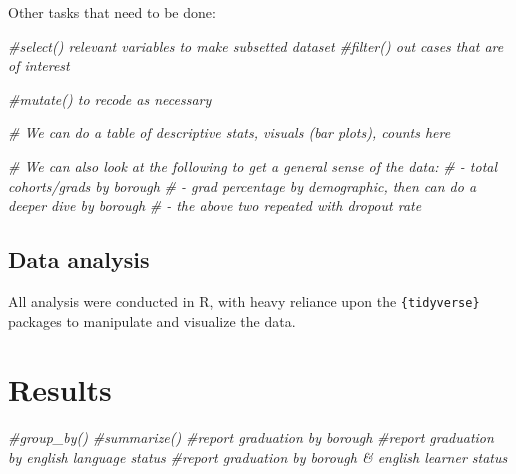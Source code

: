 \documentclass[
  english,
  man, fleqn, noextraspace]{apa6}
\newenvironment{Shaded}{\begin{snugshade}}{\end{snugshade}}
\newcommand{\CommentTok}[1]{\textcolor[rgb]{0.56,0.35,0.01}{\textit{#1}}}
\begin{document}
Other tasks that need to be done:

\begin{Shaded}
\begin{Highlighting}[]
\CommentTok{#select() relevant variables to make subsetted dataset}
\CommentTok{#filter() out cases that are of interest }
\end{Highlighting}
\end{Shaded}

\begin{Shaded}
\begin{Highlighting}[]
\CommentTok{#mutate() to recode as necessary}
\end{Highlighting}
\end{Shaded}

\begin{Shaded}
\begin{Highlighting}[]
\CommentTok{# We can do a table of descriptive stats, visuals (bar plots), counts here}

\CommentTok{# We can also look at the following to get a general sense of the data:}
\CommentTok{# - total cohorts/grads by borough}
\CommentTok{# - grad percentage by demographic, then can do a deeper dive by borough}
\CommentTok{# - the above two repeated with dropout rate}
\end{Highlighting}
\end{Shaded}

\hypertarget{data-analysis}{%
\subsection{Data analysis}\label{data-analysis}}

All analysis were conducted in R, with heavy reliance upon the \texttt{\{tidyverse\}} packages to manipulate and visualize the data.

\hypertarget{results}{%
\section{Results}\label{results}}

\begin{Shaded}
\begin{Highlighting}[]
\CommentTok{#group_by() }
\CommentTok{#summarize() }
\CommentTok{#report graduation by borough}
\CommentTok{#report graduation by english language status}
\CommentTok{#report graduation by borough & english learner status}
\end{Highlighting}
\end{Shaded}
\end{document}
